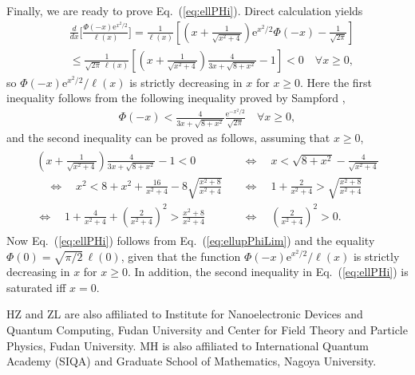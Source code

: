 \documentclass[aop]{imsart}
\theoremstyle{plain}
\theoremstyle{remark}
\newcommand{\rme}{\mathrm{e}}
\newcommand{\1}{\operatorname{\uppercase\expandafter{\romannumeral1}}}
\newcommand{\2}{\operatorname{\uppercase\expandafter{\romannumeral2}}}
\newcommand{\3}{\operatorname{\uppercase\expandafter{\romannumeral3}}}
\newcommand{\4}{\operatorname{\uppercase\expandafter{\romannumeral4}}}
\newcommand{\5}{\operatorname{\uppercase\expandafter{\romannumeral5}}}
\newcommand{\6}{\operatorname{\uppercase\expandafter{\romannumeral6}}}
\newcommand{\7}{\operatorname{\uppercase\expandafter{\romannumeral7}}}
\newcommand{\8}{\operatorname{\uppercase\expandafter{\romannumeral8}}}
\newcommand{\9}{\operatorname{\uppercase\expandafter{\romannumeral9}}}
\newcommand{\eref}[1]{Eq.~\textup{(\ref{#1})}}
\begin{document}
\begin{appendix}
Finally, we are ready to prove \eref{eq:ellPHi}. Direct calculation yields
\begin{align}
&\frac{d}{{d} x} \biggl[\frac{\Phi(-x) \mathrm{e}^{x^{2} / 2}}{\ell(x)}\biggr]
=
\frac{1}{\ell(x)}  \left[\left(x+\frac{1}{\sqrt{x^2+4}} \right)\mathrm{e}^{x^{2} / 2} \Phi(-x)  -\frac{1}{\sqrt{2\pi}} \right] \\
&\leq 
\frac{1}{\sqrt{2\pi}\,\ell(x)}  \left[\left(x+\frac{1}{\sqrt{x^2+4}} \right)\frac{4 }{3 x+\sqrt{8+x^{2}}}  - 1 \right]
< 0\quad \forall x\geq 0, \nonumber
\end{align}
so  $\Phi(-x)\rme^{x^2/2}/\ell(x)$ is strictly decreasing in $x$ for $x\geq 0$. 
Here the first inequality follows from the following inequality proved by Sampford \cite{Samp53},
\begin{align}
\Phi(-x)<\frac{4 }{3 x+\sqrt{8+x^{2}}} \frac{\mathrm{e}^{-x^{2} / 2}}{\sqrt{2 \pi}}  \quad \forall x\geq 0,
\end{align}
and the second inequality can be proved as follows, assuming that $x\geq0$,
\begin{align}
\begin{aligned}
\left(x+\frac{1}{\sqrt{x^2+4}} \right)\frac{4 }{3 x+\sqrt{8+x^{2}}}-1 < 0 
\quad&\Leftrightarrow\quad
x < \sqrt{8+x^{2}}-\frac{4}{\sqrt{x^2+4}} \\
\quad\Leftrightarrow\quad
x^2 < 8+x^{2}+\frac{16}{x^2+4}-8\sqrt{\frac{x^{2}+8}{x^2+4}}  
\quad&\Leftrightarrow\quad
1+\frac{2}{x^2+4} > \sqrt{\frac{x^{2}+8}{x^2+4}} \\
\Leftrightarrow\quad
1+\frac{4}{x^2+4}+ \left(\frac{2}{x^2+4}\right)^2 > \frac{x^{2}+8}{x^2+4}  
\quad&\Leftrightarrow\quad
\left(\frac{2}{x^2+4}\right)^2 > 0. 
\end{aligned}
\end{align}
Now \eref{eq:ellPHi} follows from \eref{eq:ellupPhiLim} and the equality $\Phi(0)=\sqrt{\pi/2}\, \ell(0)$, given that the function $\Phi(-x)\rme^{x^2/2}/\ell(x)$ is strictly decreasing in $x$ for $x\geq 0$. In addition,  the second inequality in \eref{eq:ellPHi} is saturated iff $x=0$.
\end{appendix}




\begin{acks}[Acknowledgments]	
HZ and ZL are also affiliated to Institute for Nanoelectronic Devices and Quantum Computing, Fudan University and Center for Field Theory and Particle Physics, Fudan University.
MH is also affiliated to International Quantum Academy (SIQA) and Graduate School of Mathematics, Nagoya University.
\end{acks}
\end{document}
